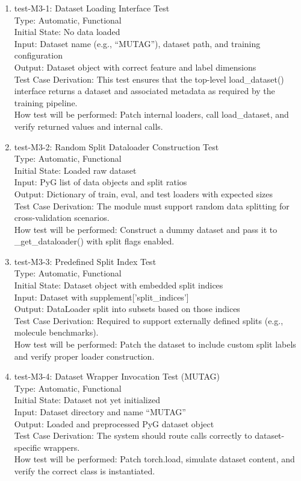 \documentclass[12pt, titlepage]{article}
\begin{document}
\begin{enumerate}

\item{test-M3-1: Dataset Loading Interface Test\\}
Type: Automatic, Functional \\
Initial State: No data loaded \\
Input: Dataset name (e.g., ``MUTAG''), dataset path, and training configuration \\
Output: Dataset object with correct feature and label dimensions \\
Test Case Derivation: This test ensures that the top-level load\_dataset() interface returns a dataset and associated metadata as required by the training pipeline. \\
How test will be performed: Patch internal loaders, call load\_dataset, and verify returned values and internal calls.

\item{test-M3-2: Random Split Dataloader Construction Test\\}
Type: Automatic, Functional \\
Initial State: Loaded raw dataset \\
Input: PyG list of data objects and split ratios \\
Output: Dictionary of train, eval, and test loaders with expected sizes \\
Test Case Derivation: The module must support random data splitting for cross-validation scenarios. \\
How test will be performed: Construct a dummy dataset and pass it to \_get\_dataloader() with split flags enabled.

\item{test-M3-3: Predefined Split Index Test\\}
Type: Automatic, Functional \\
Initial State: Dataset object with embedded split indices \\
Input: Dataset with supplement['split\_indices'] \\
Output: DataLoader split into subsets based on those indices \\
Test Case Derivation: Required to support externally defined splits (e.g., molecule benchmarks). \\
How test will be performed: Patch the dataset to include custom split labels and verify proper loader construction.

\item{test-M3-4: Dataset Wrapper Invocation Test (MUTAG)\\}
Type: Automatic, Functional \\
Initial State: Dataset not yet initialized \\
Input: Dataset directory and name ``MUTAG'' \\
Output: Loaded and preprocessed PyG dataset object \\
Test Case Derivation: The system should route calls correctly to dataset-specific wrappers. \\
How test will be performed: Patch torch.load, simulate dataset content, and verify the correct class is instantiated.


\end{enumerate}
\end{document}
